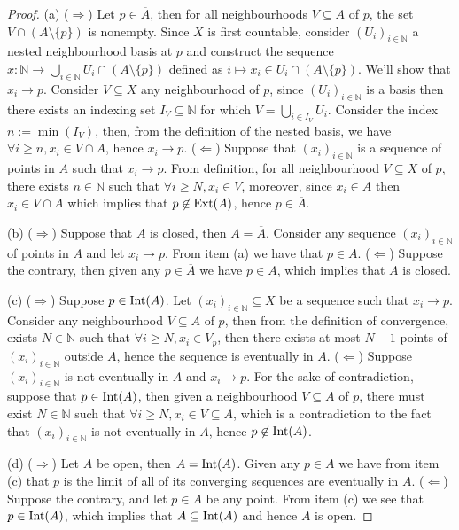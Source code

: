 \begin{proof}
  (a) (\(\Rightarrow\)) Let \(p \in \overline A\), then for all neighbourhoods
  \(V \subseteq A\) of \(p\), the set \(V \cap (A \setminus \{p\})\) is
  nonempty. Since \(X\) is first countable, consider \((U_i)_{i \in
  \mathbb{N}}\) a nested neighbourhood basis at \(p\) and construct the sequence
  \(x : \mathbb{N} \to \bigcup_{i \in \mathbb{N}} U_i \cap (A \setminus \{p\})
  \) defined as \(i \mapsto x_i \in U_i \cap (A \setminus \{p\})\). We'll show
  that \(x_i \to p\). Consider \(V \subseteq X\) any neighbourhood of \(p\),
  since \((U_i)_{i \in \mathbb{N}}\) is a basis then there exists an indexing set
  \(I_{V} \subseteq \mathbb{N}\) for which \(V = \bigcup_{i \in  I_V} U_i\).
  Consider the index \(n := \min(I_V)\), then, from the definition of the nested
  basis, we have \(\forall i \geq n, x_i \in V \cap A\), hence \(x_i \to p\).
  (\(\Leftarrow\)) Suppose that \((x_i)_{i \in \mathbb{N}}\) is a sequence of
  points in \(A\) such that \(x_i \to p\). From definition, for all
  neighbourhood \(V \subseteq X\) of \(p\), there exists \(n \in \mathbb{N}\)
  such that \(\forall i \geq N, x_i \in V\), moreover, since \(x_i \in A\) then
  \(x_i \in V \cap A\) which implies that \(p \not\in \operatorname{Ext}(A)\), hence \(p \in
  \overline A\).

  (b) (\(\Rightarrow\)) Suppose that \(A\) is closed, then \(A = \overline A\).
  Consider any sequence \((x_i)_{i \in \mathbb{N}}\) of points in \(A\) and let
  \(x_i \to p\). From item (a) we have that \(p \in A\). (\(\Leftarrow\)) 
  Suppose the contrary, then given any \(p \in \overline A\) we have \(p \in
  A\), which implies that \(A\) is closed.

  (c) (\(\Rightarrow\)) Suppose \(p \in \operatorname{Int}(A)\). Let \((x_i)_{i \in
  \mathbb{N}} \subseteq X\) be a sequence such that \(x_i \to p\). Consider any
  neighbourhood \(V \subseteq A\) of \(p\), then from the definition of
  convergence, exists \(N \in \mathbb{N}\) such that \(\forall i \geq N, x_i \in
  V_p\), then there exists at most \(N - 1\) points of \((x_i)_{i \in
  \mathbb{N}}\) outside \(A\), hence the sequence is eventually in \(A\).
  (\(\Leftarrow\)) Suppose \((x_i)_{i \in \mathbb{N}}\) is not-eventually in
  \(A\) and \(x_i \to p\). For the sake of contradiction, suppose that \(p \in
  \operatorname{Int}(A)\), then given a neighbourhood \(V \subseteq A\) of \(p\), there must
  exist \(N \in \mathbb{N}\) such that \(\forall i \geq N, x_i \in V \subseteq
  A\), which is a contradiction to the fact that \((x_i)_{i \in \mathbb{N}}\) is
  not-eventually in \(A\), hence \(p \not\in \operatorname{Int}(A)\).
  
  (d) (\(\Rightarrow\)) Let \(A\) be open, then \(A = \operatorname{Int}(A)\). Given any \(p
  \in A\) we have from item (c) that \(p\) is the limit of all of its converging
  sequences are eventually in \(A\). (\(\Leftarrow\)) Suppose the contrary, and
  let \(p \in A\) be any point. From item (c) we see that \(p \in \operatorname{Int}(A)\),
  which implies that \(A \subseteq \operatorname{Int}(A)\) and hence \(A\) is open.
\end{proof}

